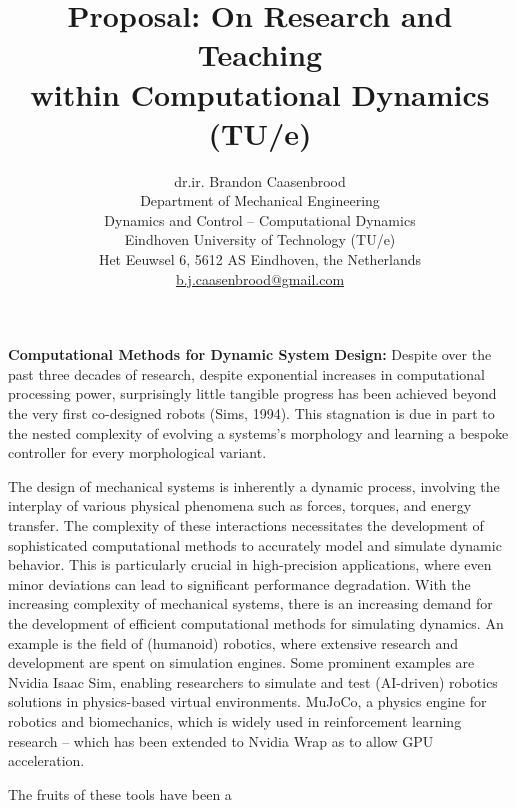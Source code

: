 \documentclass[12pt]{article}
\title{Proposal: On Research and Teaching \\ within Computational Dynamics (TU/e)}
\author{
dr.ir. Brandon Caasenbrood\\
  Department of Mechanical Engineering\\
  Dynamics and Control -- Computational Dynamics \\[0.5em]
  Eindhoven University of Technology (TU/e)\\
  Het Eeuwsel 6, 5612 AS Eindhoven, the Netherlands\\
  \url{b.j.caasenbrood@gmail.com}
  \vspace{-8mm}
}
\begin{document}
\maketitle

\vspace{-10mm}



\hspace{5mm} \textbf{Computational Methods for Dynamic System Design:} 
Despite over the past three decades of research, despite exponential increases in computational processing power, surprisingly little tangible progress has been achieved beyond the very first co-designed robots (Sims, 1994). This stagnation is due in part to the nested complexity of evolving a systems’s morphology and learning a bespoke controller for every morphological variant.

The design of mechanical systems is inherently a dynamic process, involving the interplay of various physical phenomena such as forces, torques, and energy transfer. The complexity of these interactions necessitates the development of sophisticated computational methods to accurately model and simulate dynamic behavior. This is particularly crucial in high-precision applications, where even minor deviations can lead to significant performance degradation.
With the increasing complexity of mechanical systems, there is an increasing demand for the development of efficient computational methods for simulating dynamics. An example is the field of (humanoid) robotics, where extensive research and development are spent on simulation engines. Some prominent examples are Nvidia Isaac Sim, enabling researchers to simulate and test (AI-driven) robotics solutions in physics-based virtual environments. MuJoCo, a physics engine for robotics and biomechanics, which is widely used in reinforcement learning research -- which has been extended to Nvidia Wrap as to allow GPU acceleration. 

The fruits of these tools have been a 
\end{document}
